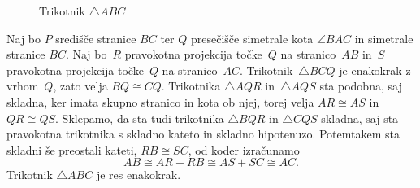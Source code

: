 \begin{dokaz}
\begin{figure}[ht]
\begin{center}
\end{center}
    \caption{Trikotnik $\triangle ABC$}
    \label{fig:trikotnik}
  \end{figure}
  Naj bo $P$ središče stranice $BC$ ter $Q$ presečišče simetrale kota $\angle BAC$ in simetrale stranice $BC$.
  Naj bo~$R$ pravokotna projekcija točke~$Q$ na stranico~$AB$ in~$S$ pravokotna projekcija točke~$Q$ na stranico~$AC$.
  Trikotnik~$\triangle BCQ$ je enakokrak z vrhom~$Q$, zato velja $BQ \cong CQ$.
  Trikotnika $\triangle AQR$ in~$\triangle AQS$ sta podobna, saj skladna, ker imata skupno stranico in kota ob njej, torej velja $AR \cong AS$ in $QR \cong QS$.
  Sklepamo, da sta tudi trikotnika $\triangle BQR$ in $\triangle CQS$ skladna, saj sta pravokotna trikotnika s skladno kateto in skladno hipotenuzo. Potemtakem sta skladni še preostali kateti, $RB \cong SC$, od koder izračunamo
  \begin{equation*}
    AB \cong AR + RB \cong AS + SC \cong AC.
  \end{equation*}
  Trikotnik $\triangle ABC$ je res enakokrak.
\end{dokaz}





